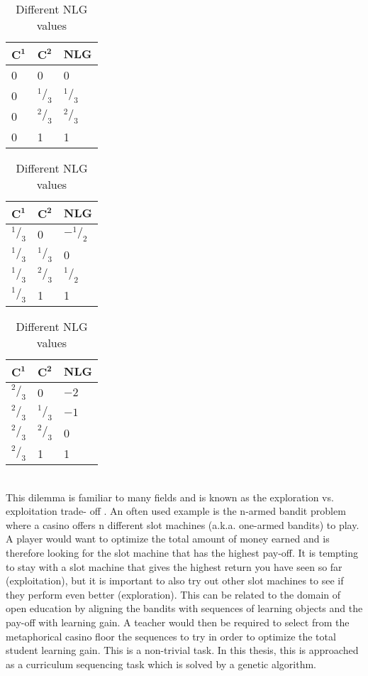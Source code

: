 \begin{table}
	\begin{subtable}{0.25\linewidth}
	\centering
	\begin{tabular}{lll}\hline
		$\mathbf{C^1}$ & $\mathbf{C^2}$ & \textbf{NLG} \\\hline
		0		& 0			& 0 \\
		0		& $^1/_3$	& $^1/_3$\\
		0		& $^2/_3$	& $^2/_3$\\
		0		& 1			& 1\\
	\end{tabular}
	\end{subtable}
	\hspace{0.1\linewidth}
	\begin{subtable}{0.25\linewidth}
	\centering
	\begin{tabular}{lll}\hline
		$\mathbf{C^1}$ & $\mathbf{C^2}$ & \textbf{NLG} \\\hline
		$^1/_3$	& 0			& $-^1/_2$\\
		$^1/_3$	& $^1/_3$	& 0\\
		$^1/_3$	& $^2/_3$	& $^1/_2$\\
		$^1/_3$	& 1			& 1\\
	\end{tabular}
	\end{subtable}
	\hspace{0.1\linewidth}
	\begin{subtable}{0.25\linewidth}
	\centering
	\begin{tabular}{lll}\hline
		$\mathbf{C^1}$ & $\mathbf{C^2}$ & \textbf{NLG} \\\hline
		$^2/_3$	& 0			& $-2$\\
		$^2/_3$	& $^1/_3$	& $-1$\\
		$^2/_3$	& $^2/_3$	& 0\\
		$^2/_3$	& 1			& 1\\
	\end{tabular}
	\end{subtable}
	\caption{Different NLG values}
	\label{tab:nlg_values}
\end{table}\\
\noindent
This dilemma is familiar to many fields and is known as the exploration vs.
exploitation trade- off \citep{Holland1992}. An often used example is the
n-armed bandit problem \citep{Sutton1998} where a casino offers n different
slot machines (a.k.a. one-armed bandits) to play. A player would want to
optimize the total amount of money earned and is therefore looking for the slot
machine that has the highest pay-off. It is tempting to stay with a slot
machine that gives the highest return you have seen so far (exploitation), but
it is important to also try out other slot machines to see if they perform even
better (exploration). This can be related to the domain of open education by
aligning the bandits with sequences of learning objects and the pay-off with
learning gain. A teacher would then be required to select from the metaphorical
casino floor the sequences to try in order to optimize the total student
learning gain. This is a non-trivial task. In this thesis, this is approached
as a curriculum sequencing task which is solved by a genetic algorithm.


